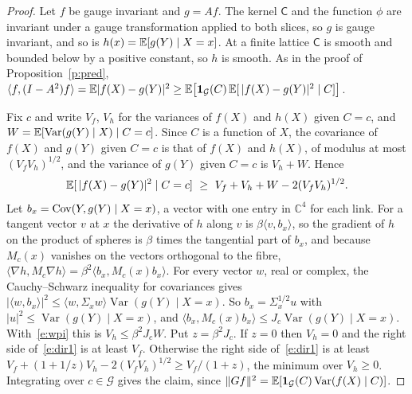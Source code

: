 \begin{proof}
Let $f$ be gauge invariant and $g=Af$. The kernel $\mathsf C$ and the function $\phi$ are invariant under a
gauge transformation applied to both slices, so $g$ is gauge invariant, and so is
$h(x)=\mathbb{E}[g(Y)\mid X=x]$. At a finite lattice $\mathsf C$ is smooth and bounded below by a positive constant,
so $h$ is smooth. As in the proof of Proposition~\ref{p:pred},
$\langle f,(I-A^2)f\rangle=\mathbb{E}|f(X)-g(Y)|^2\ge\mathbb{E}\big[\mathbf 1_{\mathcal G}(C)\,\mathbb{E}[\,|f(X)-g(Y)|^2\mid C]\big]$.

Fix $c$ and write $V_f$, $V_h$ for the variances of $f(X)$ and $h(X)$ given $C=c$, and
$W=\mathbb{E}[\operatorname{Var}(g(Y)\mid X)\mid C=c]$. Since $C$ is a function of $X$, the covariance of $f(X)$ and
$g(Y)$ given $C=c$ is that of $f(X)$ and $h(X)$, of modulus at most $(V_fV_h)^{1/2}$, and the variance of
$g(Y)$ given $C=c$ is $V_h+W$. Hence
\begin{equation}\label{e:dir1}
\mathbb{E}[\,|f(X)-g(Y)|^2\mid C=c]\ \ge\ V_f+V_h+W-2(V_fV_h)^{1/2}.
\end{equation}
Let $b_x=\operatorname{Cov}(Y,g(Y)\mid X=x)$, a vector with one entry in $\mathbb C^4$ for each link. For a tangent vector $v$ at
$x$ the derivative of $h$ along $v$ is $\beta\langle v,b_x\rangle$, so the gradient of $h$ on the product of
spheres is $\beta$ times the tangential part of $b_x$, and because $M_c(x)$ vanishes on the vectors orthogonal
to the fibre, $\langle\nabla h,M_c\nabla h\rangle=\beta^2\langle b_x,M_c(x)b_x\rangle$. For every vector
$w$, real or complex, the Cauchy--Schwarz inequality for covariances gives
$|\langle w,b_x\rangle|^2\le\langle w,\Sigma_xw\rangle\operatorname{Var}(g(Y)\mid X=x)$. So
$b_x=\Sigma_x^{1/2}u$ with $|u|^2\le\operatorname{Var}(g(Y)\mid X=x)$, and
$\langle b_x,M_c(x)b_x\rangle\le J_c\operatorname{Var}(g(Y)\mid X=x)$. With~\eqref{e:wpi} this is
$V_h\le\beta^2J_cW$. Put $z=\beta^2J_c$. If $z=0$ then $V_h=0$ and the right side of~\eqref{e:dir1} is at
least $V_f$. Otherwise the right side of~\eqref{e:dir1} is at least
$V_f+(1+1/z)V_h-2(V_fV_h)^{1/2}\ge V_f/(1+z)$, the minimum over $V_h\ge0$. Integrating over
$c\in\mathcal G$ gives the claim, since $\|Gf\|^2=\mathbb{E}[\mathbf 1_{\mathcal G}(C)\operatorname{Var}(f(X)\mid C)]$.
\end{proof}

